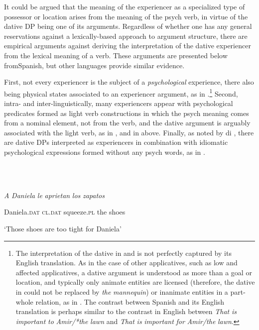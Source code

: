 \documentclass[output=paper,modfonts,nonflat]{langsci/langscibook}
\begin{document}
It could be argued that the meaning of the experiencer as a specialized type of possessor or location arises from the meaning of the psych verb, in virtue of the dative DP being one of its arguments. Regardless of whether one has any general reservations against a lexically-based approach to argument structure, there are empirical arguments against deriving the interpretation of the dative experiencer from the lexical meaning of a verb. These arguments are presented below fromSpanish, but other languages provide similar evidence. 

First, not every experiencer is the subject of a \textit{psychological} experience, there also being physical states associated to an experiencer argument, as in .\footnote{The interpretation of the dative in  and  is not perfectly captured by its English translation. As in the case of other applicatives, such as low and affected applicatives, a dative argument is understood as more than a goal or location, and typically only animate entities are licensed (therefore, the dative in  could not be replaced by \textit{the} \textit{mannequin}) or inanimate entities in a part-whole relation, as in . The contrast between Spanish  and its English translation is perhaps similar to the contrast in English between \textit{That} \textit{is} \textit{important} \textit{to} \textit{Amir/*the} \textit{lawn} and \textit{That} \textit{is} \textit{important} \textit{for} \textit{Amir/the} \textit{lawn}.} Second, intra- and inter-linguistically, many experiencers appear with psychological predicates formed as light verb constructions in which the psych meaning comes from a nominal element, not from the verb, and the dative argument is arguably associated with the light verb, as in , and in  above. Finally, as noted by di \citet{Tullio2015}, there are dative DPs interpreted as experiencers in combination with idiomatic psychological expressions formed without any psych words, as in . 

\ea%
    \label{ex:key:16}
    \gll\\
        \\
    \glt
    \z

           \textit{A} \textit{Daniela}   \textit{le}     \textit{aprietan}  \textit{los} \textit{zapatos} 

  Daniela.\textsc{dat} \textsc{cl.dat} squeeze.\textsc{pl}   the shoes

  ‘Those shoes are too tight for Daniela’
\end{document}
